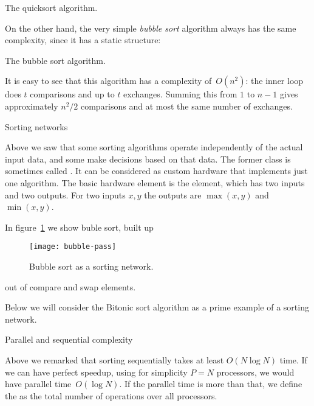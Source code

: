 \begin{displayalgorithm}
  \caption{The quicksort algorithm.}
\end{displayalgorithm}

On the other hand, the very simple \emph{bubble
  sort} algorithm
always has the same complexity, since it has a static structure:

\begin{displayalgorithm}
  \caption{The bubble sort algorithm.}
\end{displayalgorithm}

It is easy to see that this algorithm has a complexity of~$O(n^2)$:
the inner loop does $t$ comparisons and up to $t$ exchanges. Summing
this from $1$ to $n-1$ gives approximately $n^2/2$ comparisons and
at most the same number of exchanges.

 {Sorting networks}

Above we saw that some sorting algorithms operate independently of the
actual input data, and some make decisions based on that data.
The former class is sometimes
called . It can be considered
as custom hardware that implements just one algorithm. The 
basic hardware element is the 
element, which has two inputs and two outputs. For two inputs $x,y$
the outputs are $\max(x,y)$ and $\min(x,y)$.

In figure~\ref{fig:bubble-pass} we show buble sort, built up
%
\begin{figure}[ht]
  \texttt{[image: bubble-pass]}
  \caption{Bubble sort as a sorting network.}
  \label{fig:bubble-pass}
\end{figure}
%
out of compare and swap elements.

Below we will consider the Bitonic sort algorithm
as a prime example of a sorting network.

 {Parallel and sequential complexity}

Above we remarked that sorting sequentially takes at least $O(N\log N)$ time.
If we can have perfect speedup, using for simplicity $P=N$ processors,
we would have parallel time~$O(\log N)$. If the parallel time
is more than that, we define the
%
as the total number of operations over all processors.


